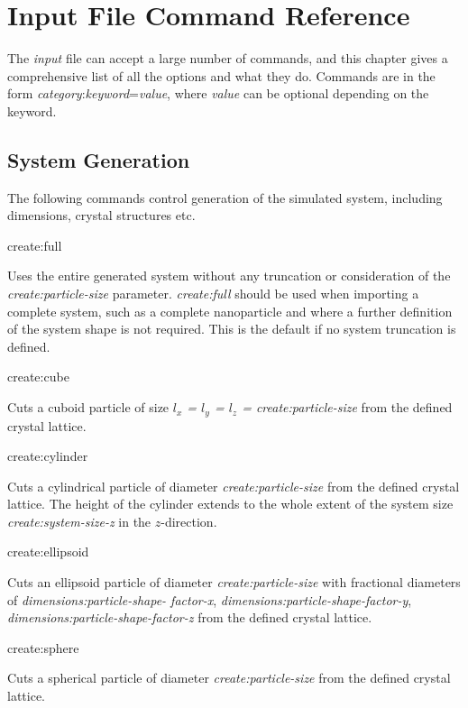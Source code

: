 \chapter{Input File Command Reference}\label{chap:InputFileCommandReference}
The \textit{input} file can accept a large number of commands, and this chapter gives a comprehensive list of all the options and what they do. Commands are in the form \textit{category}:\textit{keyword}=\textit{value}, where \textit{value} can be optional depending on the keyword.

\section*{System Generation}
The following commands control generation of the simulated system, including dimensions, crystal structures etc.

{\zicf create:full}
Uses the entire generated system without any truncation or consideration of the
\textit{create:particle-size} parameter. \textit{create:full} should be used when
importing a complete system, such as a complete nanoparticle and where a further
definition of the system shape is not required. This is the default if no system
truncation is defined.

{\zicf create:cube}
Cuts a cuboid particle of size \textit{$l_x$ = $l_y$ = $l_z$ = create:particle-size}
from the defined crystal lattice.

{\zicf create:cylinder}
Cuts a cylindrical particle of diameter \textit{create:particle-size} from the
defined crystal lattice. The height of the cylinder extends to the whole extent
of the system size \textit{create:system-size-z} in the $z$-direction.

{\zicf create:ellipsoid}
Cuts an ellipsoid particle of diameter \textit{create:particle-size} with fractional
diameters of \textit{dimensions:particle-shape- factor-x},
\textit{dimensions:particle-shape-factor-y},
\textit{dimensions:particle-shape-factor-z} from the defined crystal lattice.

{\zicf create:sphere}
Cuts a spherical particle of diameter \textit{create:particle-size} from the
defined crystal lattice.

